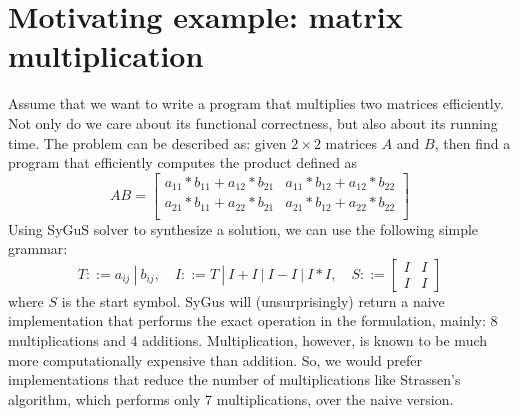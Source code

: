 \section{Motivating example: matrix multiplication}
\label{sec:example}

Assume that we want to write a program that multiplies two matrices efficiently. 
%
Not only do we care about its functional correctness, but also about its running time.
%
The problem can be described as: given $2 \times 2$ matrices $A$ and $B$, then find a program that efficiently computes the product defined as
%
\begin{equation}
    AB =
\begin{bmatrix}
a_{11} * b_{11} + a_{12} * b_{21} &
a_{11} * b_{12} + a_{12} * b_{22} \\
a_{21} * b_{11} + a_{22} * b_{21} &
a_{21} * b_{12} + a_{22} * b_{22} \\
\end{bmatrix}
\label{eqn:matrix-mul}
\end{equation}
%
%
Using SyGuS solver to synthesize a solution, we can use the following simple grammar:
%
\[
T ::= a_{ij} \ | \ b_{ij}, \quad
I ::= T \ | \ I + I \ | \ I - I \ | \ I * I, \quad
S ::=
\begin{bmatrix} I & I \\
I & I
\end{bmatrix}
\]
%
where $S$ is the start symbol. 
%
SyGus will (unsurprisingly) return a naive implementation that performs the exact operation in the formulation, mainly: 8 multiplications and 4 additions.
%
Multiplication, however, is known to be much more computationally expensive than addition.
%
So, we would prefer implementations that reduce the number of multiplications like Strassen's algorithm, which performs only 7 multiplications, over the naive version.
%
